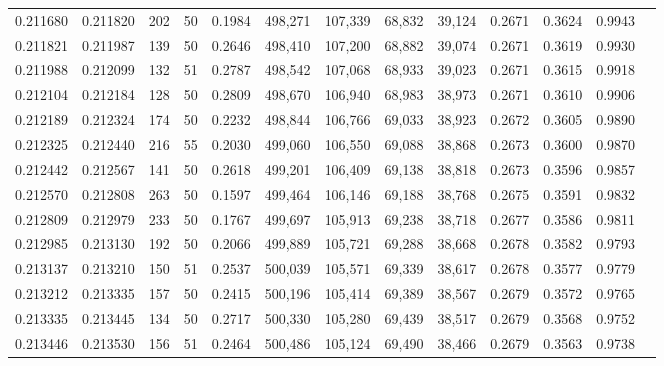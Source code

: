 \begin{tabular}{rrrrrrrrrrrrr}
0.211680 & 0.211820 &   202 &  50 &                                     0.1984 & 498,271 & 107,339 &  68,832 &  39,124 & 0.2671 & 0.3624 & 0.9943 \\
0.211821 & 0.211987 &   139 &  50 &                                     0.2646 & 498,410 & 107,200 &  68,882 &  39,074 & 0.2671 & 0.3619 & 0.9930 \\
0.211988 & 0.212099 &   132 &  51 &                                     0.2787 & 498,542 & 107,068 &  68,933 &  39,023 & 0.2671 & 0.3615 & 0.9918 \\
0.212104 & 0.212184 &   128 &  50 &                                     0.2809 & 498,670 & 106,940 &  68,983 &  38,973 & 0.2671 & 0.3610 & 0.9906 \\
0.212189 & 0.212324 &   174 &  50 &                                     0.2232 & 498,844 & 106,766 &  69,033 &  38,923 & 0.2672 & 0.3605 & 0.9890 \\
0.212325 & 0.212440 &   216 &  55 &                                     0.2030 & 499,060 & 106,550 &  69,088 &  38,868 & 0.2673 & 0.3600 & 0.9870 \\
0.212442 & 0.212567 &   141 &  50 &                                     0.2618 & 499,201 & 106,409 &  69,138 &  38,818 & 0.2673 & 0.3596 & 0.9857 \\
0.212570 & 0.212808 &   263 &  50 &                                     0.1597 & 499,464 & 106,146 &  69,188 &  38,768 & 0.2675 & 0.3591 & 0.9832 \\
0.212809 & 0.212979 &   233 &  50 &                                     0.1767 & 499,697 & 105,913 &  69,238 &  38,718 & 0.2677 & 0.3586 & 0.9811 \\
0.212985 & 0.213130 &   192 &  50 &                                     0.2066 & 499,889 & 105,721 &  69,288 &  38,668 & 0.2678 & 0.3582 & 0.9793 \\
0.213137 & 0.213210 &   150 &  51 &                                     0.2537 & 500,039 & 105,571 &  69,339 &  38,617 & 0.2678 & 0.3577 & 0.9779 \\
0.213212 & 0.213335 &   157 &  50 &                                     0.2415 & 500,196 & 105,414 &  69,389 &  38,567 & 0.2679 & 0.3572 & 0.9765 \\
0.213335 & 0.213445 &   134 &  50 &                                     0.2717 & 500,330 & 105,280 &  69,439 &  38,517 & 0.2679 & 0.3568 & 0.9752 \\
0.213446 & 0.213530 &   156 &  51 &                                     0.2464 & 500,486 & 105,124 &  69,490 &  38,466 & 0.2679 & 0.3563 & 0.9738 \\

\end{tabular}
